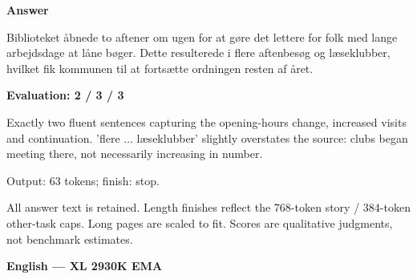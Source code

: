 \documentclass[10pt]{article}
\begin{document}
{\begin{minipage}{\textwidth}
\textbf{Answer}\par Biblioteket åbnede to aftener om ugen for at gøre det lettere for folk med lange arbejdsdage at låne bøger. Dette resulterede i flere aftenbesøg og læseklubber, hvilket fik kommunen til at fortsætte ordningen resten af året.\par\smallskip
\textbf{Evaluation: 2 / 3 / 3}\par Exactly two fluent sentences capturing the opening-hours change, increased visits and continuation. 'flere ... læseklubber' slightly overstates the source: clubs began meeting there, not necessarily increasing in number.
\par {\color{gray} Output: 63 tokens; finish: stop.}\par
\medskip\footnotesize All answer text is retained. Length finishes reflect the 768-token story / 384-token other-task caps. Long pages are scaled to fit. Scores are qualitative judgments, not benchmark estimates.
\end{minipage}}%
\noindent\ifdim\dimexpr\ht\languagepage+\dp\languagepage\relax>0.93\textheight%
\resizebox*{!}{0.93\textheight}{\usebox{\languagepage}}%
\else\usebox{\languagepage}\fi%
\clearpage
{\Large\bfseries English --- XL 2930K EMA}\par\smallskip
\end{document}
